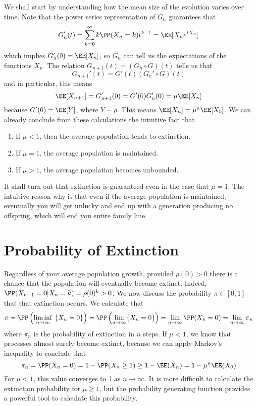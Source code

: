 We shall start by understanding how the mean size of the evolution varies over time. Note that the power series representation of $G_n$ guarantees that
%
\[ G_n'(t) = \sum_{k = 0}^\infty k \PP(X_n = k) t^{k-1} = \EE[X_ne^{tX_n}] \]
%
which implies $G_n'(0) = \EE[X_n]$, so $G_n$ can tell us the expectations of the functions $X_n$. The relation $G_{n+1}(t) = (G_n \circ G)(t)$ tells us that
%
\[ G_{n+1}'(t) = G'(t)(G_n' \circ G)(t) \]
%
and in particular, this means
%
\[ \EE[X_{n+1}] = G_{n+1}'(0) = G'(0) G_n'(0) = \mu \EE[X_n] \]
%
because $G'(0) = \EE[Y]$, where $Y \sim \rho$. This means $\EE[X_n] = \mu^n \EE[X_0]$. We can already conclude from these calculations the intuitive fact that
%
\begin{enumerate}
    \item If $\mu < 1$, then the average population tends to extinction.
    \item If $\mu = 1$, the average population is maintained.
    \item If $\mu > 1$, the average population becomes unbounded.
\end{enumerate}
%
It shall turn out that extinction is guaranteed even in the case that $\mu = 1$. The intuitive reason why is that even if the average population is maintained, eventually you will get unlucky and end up with a generation producing no offspring, which will end you entire family line.

\section{Probability of Extinction}

Regardless of your average population growth, provided $\rho(0) > 0$ there is a chance that the population will eventually become extinct. Indeed, $\PP(X_{n+1} = 0|X_n = k) = \rho(0)^k > 0$. We now discuss the probability $\pi \in [0,1]$ that that extinction occurs. We calculate that
%
\[ \pi = \PP \left( \liminf_{n \to \infty}\ \{ X_n = 0 \} \right) = \PP \left( \lim_{n \to \infty} \{ X_n = 0 \} \right) = \lim_{n \to \infty} \PP(X_n = 0) = \lim_{n \to \infty} \pi_n \]
%
where $\pi_n$ is the probability of extinction in $n$ steps. If $\mu < 1$, we know that processes almost surely become extinct, because we can apply Markov's inequality to conclude that
%
\[ \pi_n = \PP(X_n = 0) = 1 - \PP(X_n \geq 1) \geq 1 - \EE(X_n) = 1 - \mu^n \EE(X_0) \]
%
For $\mu < 1$, this value converges to 1 as $n \to \infty$. It is more difficult to calculate the extinction probability for $\mu \geq 1$, but the probability generating function provides a powerful tool to calculate this probability.

